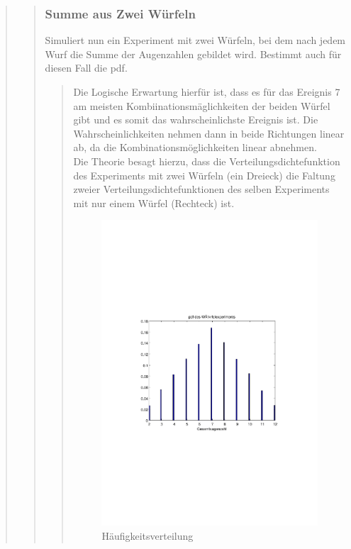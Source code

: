 \begin{quote}
\begin{quote}
        
        \subsubsection{Summe aus Zwei Würfeln}
        Simuliert nun ein Experiment mit zwei Würfeln, bei dem nach jedem Wurf die Summe der Augenzahlen gebildet wird. Bestimmt
        auch für diesen Fall die pdf.
        
        \begin{quote}
            
            Die Logische Erwartung hierfür ist, dass es für das Ereignis 7 am meisten Kombiinationsmäglichkeiten
            der beiden Würfel gibt und es somit das wahrscheinlichste Ereignis ist. Die Wahrscheinlichkeiten nehmen dann
            in beide Richtungen linear ab, da die Kombinationsmöglichkeiten linear abnehmen.\\
            Die Theorie besagt hierzu, dass die Verteilungsdichtefunktion des Experiments mit zwei Würfeln (ein
            Dreieck) die Faltung zweier Verteilungsdichtefunktionen des selben Experiments mit nur einem Würfel (Rechteck) ist.
            
            \begin{figure}[H]
            \centering
                \includegraphics[scale=0.7, trim = 20mm 80mm 20mm 90mm, clip]{Bilder/A1_2}
                    \caption{Häufigkeitsverteilung}
                    \label{fig:A1_2}
            \end{figure}
            

\end{quote}
\end{quote}
\end{quote}
